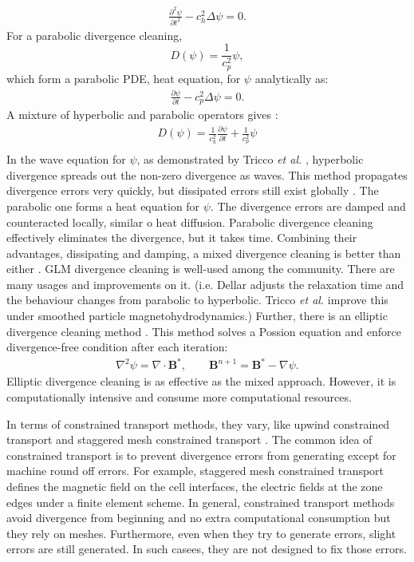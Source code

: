 \begin{align*}
\frac{\partial^2\psi}{\partial t^2}-c_h^2\Delta\psi=0.
\end{align*}
For a parabolic divergence cleaning,$$D(\psi) = \frac{1}{c_p^2} \psi,$$
which form a parabolic PDE, heat equation, for $\psi$ analytically as:
\begin{align*}
\frac{\partial\psi}{\partial t}-c_p^2\Delta\psi=0.
\end{align*}
A mixture of hyperbolic and parabolic operators gives :
\begin{align*}
D(\psi) = \frac{1}{c_h^2} \frac{\partial \psi}{\partial t} + \frac{1}{c_p^2} \psi\\
\end{align*}
In the wave equation for $\psi$, as demonstrated by Tricco \textit{et al.} \cite{tricco2016constrained}, hyperbolic divergence spreads out the non-zero divergence as waves. This method propagates divergence errors very quickly, but dissipated errors still exist globally \cite{tricco2016constrained}. The parabolic one forms a heat equation for $\psi$. The divergence errors are damped and counteracted locally, similar o heat diffusion. Parabolic divergence cleaning effectively eliminates the divergence, but it takes time. Combining their advantages, dissipating and damping, a mixed divergence cleaning is better than either \cite{vides2013divergence,tricco2016constrained}. GLM divergence cleaning is well-used among the community. There are many usages and improvements on it. (i.e. Dellar \cite{dellar2022hyperbolic} adjusts the relaxation time and the behaviour changes from parabolic to hyperbolic. Tricco \textit{et al.} \cite{tricco2016constrained} improve this under smoothed particle magnetohydrodynamics.) Further, there is an elliptic divergence cleaning method \cite{neilsen2006relativistic,cheong2022extension}. This method solves a Possion equation and enforce divergence-free condition after each iteration: 
\begin{align*}
    \nabla^2\psi=\nabla\cdot\mathbf{B}^*, \quad \quad \mathbf{B}^{n+1}=\mathbf{B}^*-\nabla\psi.
\end{align*}
Elliptic divergence cleaning is as effective as the mixed approach. However, it is computationally intensive and consume more computational resources.

In terms of constrained transport methods, they vary, like upwind constrained transport \cite{londrillo2004divergence} and staggered mesh constrained transport \cite{vides2013divergence}. The common idea of constrained transport is to prevent divergence errors from generating except for machine round off errors. For example, staggered mesh constrained transport \cite{vides2013divergence} defines the magnetic field on the cell interfaces, the electric fields at the zone edges under a finite element scheme. In general, constrained transport methods avoid divergence from beginning and no extra computational consumption but they rely on meshes. Furthermore, even when they try to generate errors, slight errors are still generated. In such casees, they are not designed to fix those errors.

